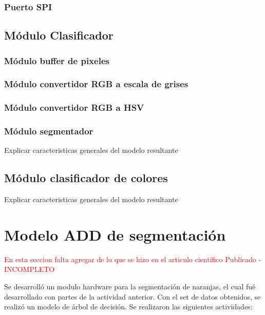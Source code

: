 \documentclass[twoside,spanish,ESP,MSc]{plantillaLabUPV}
\theoremstyle{definition}
\begin{document}
\subsubsection{Puerto SPI}


\subsection{Módulo Clasificador}

\subsubsection{Módulo buffer de pixeles}

\subsubsection{Módulo convertidor RGB a escala de grises}

\subsubsection{Módulo convertidor RGB a HSV}

\subsubsection{Módulo segmentador}
Explicar caracteristicas generales del modelo resultante

\subsection{Módulo clasificador de colores}
Explicar caracteristicas generales del modelo resultante

\section{Modelo ADD de segmentación}
\textcolor{red}{En esta seccion falta agregar de lo que se hizo en el articulo cientifico Publicado - INCOMPLETO}

Se desarrolló un modulo hardware para la segmentación de naranjas, el cual fué desarrollado con partes de la actividad anterior. Con el set de datos obtenidos, se realizó un modelo de árbol de decisión. Se realizaron las siguientes actividades:
\end{document}
